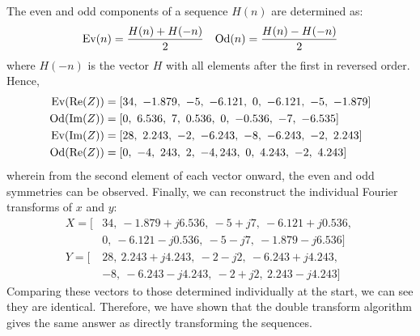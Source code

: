\documentclass[a4paper, 11pt]{article}
\begin{document}
\begin{enumerate}[label=\alph*)]
    The even and odd components of a sequence $H(n)$ are determined as:
    \begin{align*}
        \text{Ev}(n) = \frac{H(n)+H(-n)}{2} && \text{Od}(n) = \frac{H(n)-H(-n)}{2}
    \end{align*}
    where $H(-n)$ is the vector $H$ with all elements after the first in
    reversed order. Hence,
    \begin{align*}
        \Ev(\Re(Z)) &= [34,\ -1.879,\ -5,\ -6.121,\ 0,\ -6.121,\ -5,\ -1.879] \\
        \Od(\Im(Z)) &= [0,\ 6.536,\ 7,\ 0.536,\ 0,\ -0.536,\ -7,\ -6.535] \\
        \Ev(\Im(Z)) &= [28,\ 2.243,\ -2,\ -6.243,\ -8,\ -6.243,\ -2,\ 2.243] \\
        \Od(\Re(Z)) &= [0,\ -4,\ 243,\ 2,\ -4,243,\ 0,\ 4.243,\ -2,\ 4.243]
    \end{align*}
    wherein from the second element of each vector onward, the even and odd
    symmetries can be observed. Finally, we can reconstruct the individual
    Fourier transforms of $x$ and $y$:
    \begin{align*}
        X = [&34,\ -1.879+j6.536,\ -5+j7,\ -6.121+j0.536,\ \\
             &0,\ -6.121-j0.536,\ -5-j7,\ -1.879-j6.536] \\
        Y = [&28,\ 2.243+j4.243,\ -2-j2,\ -6.243+j4.243,\ \\
             &-8,\ -6.243-j4.243,\ -2+j2,\ 2.243-j4.243]
    \end{align*}
    Comparing these vectors to those determined individually at the start, we
    can see they are identical. Therefore, we have shown that the double
    transform algorithm gives the same answer as directly transforming the
    sequences.

\newpage


\end{enumerate}
\end{document}
